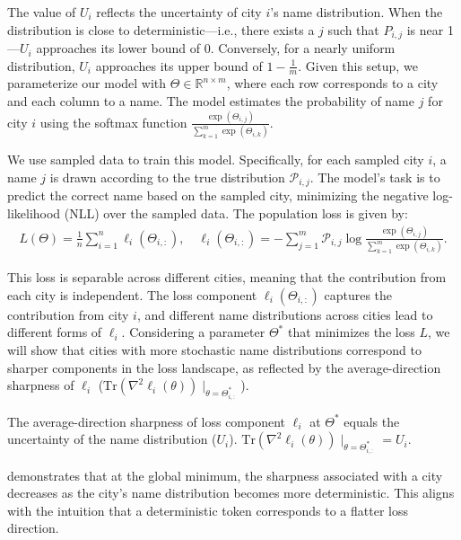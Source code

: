 The value of $U_i$ reflects the uncertainty of city $i$'s name distribution. When the distribution is close to deterministic—i.e., there exists a $j$ such that $P_{i,j}$ is near 1—$U_i$ approaches its lower bound of 0. Conversely, for a nearly uniform distribution, $U_i$ approaches its upper bound of $1 - \frac{1}{m}$. 
Given this setup, we parameterize our model with $\Theta \in \mathbb{R}^{n \times m}$, where each row corresponds to a city and each column to a name. The model estimates the probability of name $j$ for city $i$ using the softmax function $\frac{\exp(\Theta_{i,j})}{\sum_{k=1}^m \exp(\Theta_{i,k})}$.

We use sampled data to train this model. Specifically, for each sampled city $i$, a name $j$ is drawn according to the true distribution $\mathcal{P}_{i,j}$. The model's task is to predict the correct name based on the sampled city, minimizing the negative log-likelihood (NLL) over the sampled data. 
The population loss is given by:
\begin{align}
\label{eq:toy}
    L(\Theta) = \frac{1}{n} \sum_{i = 1}^n \ell_i(\Theta_{i,:}) ,\quad
\ell_i(\Theta_{i,:}) = -\sum_{j = 1}^m \mathcal{P}_{i,j} \log \frac{\exp(\Theta_{i,j})}{\sum_{k=1}^m \exp(\Theta_{i, k})}.
\end{align}


This loss is separable across different cities, meaning that the contribution from each city is independent. The loss component $\ell_i(\Theta_{i,:})$ captures the contribution from city $i$, and different name distributions across cities lead to different forms of $\ell_i$.
Considering a parameter $\Theta^*$ that minimizes the loss $L$, we will show that cities with more stochastic name distributions correspond to sharper components in the loss landscape, as reflected by the average-direction sharpness of $\ell_i$ ($\mathrm{Tr}(\nabla^2 \ell_i(\theta)) \mid_{\theta = \Theta^*_{i,:}}$). 


\begin{lemma}
\label{lem:sharp}
The average-direction sharpness of loss component $\ell_i$ at $\Theta^*$ equals the uncertainty of the name distribution ($U_i$).
$\mathrm{Tr}(\nabla^2 \ell_i(\theta)) \mid_{\theta = \Theta^*_{i,:}} = U_i.$
\end{lemma}
 demonstrates that at the global minimum, the sharpness associated with a city decreases as the city's name distribution becomes more deterministic. This aligns with the intuition that a deterministic token corresponds to a flatter loss direction.

